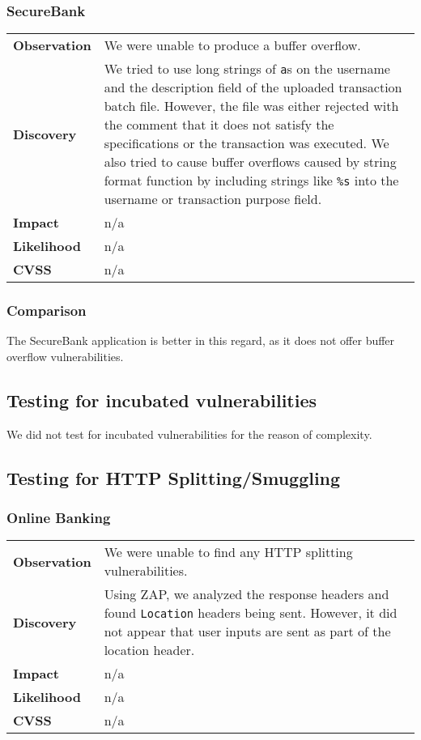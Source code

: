 \subsubsection*{SecureBank}

\begin{tabular}{l|p{10cm}}

\textbf{Observation} & We were unable to produce a buffer overflow. \\
\textbf{Discovery} & We tried to use long strings of \texttt{a}s on the username and the description field of the uploaded transaction batch file. However, the file was either rejected with the comment that it does not satisfy the specifications or the transaction was executed. We also tried to cause buffer overflows caused by string format function by including strings like \texttt{\%s} into the username or transaction purpose field. \\
\textbf{Impact} & n/a \\
\textbf{Likelihood} & n/a \\
\textbf{CVSS} & n/a \\
\end{tabular}

\subsubsection*{Comparison}
The SecureBank application is better in this regard, as it does not offer buffer overflow vulnerabilities.

\subsection{Testing for incubated vulnerabilities}
We did not test for incubated vulnerabilities for the reason of complexity.

\clearpage

\subsection{Testing for HTTP Splitting/Smuggling}

\subsubsection*{Online Banking}

\begin{tabular}{l|p{10cm}}

\textbf{Observation} & We were unable to find any HTTP splitting vulnerabilities. \\
\textbf{Discovery} & Using ZAP, we analyzed the response headers and found \texttt{Location} headers being sent. However, it did not appear that user inputs are sent as part of the location header. \\
\textbf{Impact} & n/a \\
\textbf{Likelihood} & n/a \\
\textbf{CVSS} & n/a \\
\end{tabular}

